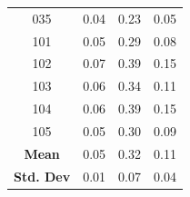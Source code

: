 \documentclass[12pt]{article}
\begin{document}
\begin{table}[!h]
\begin{tabular}{c | c c c}
	035 &   0.04 &     0.23 &       0.05 \\
	101 &   0.05 &     0.29 &       0.08 \\
	102 &   0.07 &     0.39 &       0.15 \\
	103 &   0.06 &     0.34 &       0.11 \\
	104 &   0.06 &     0.39 &       0.15 \\
	105 &   0.05 &     0.30 &       0.09 \\
	\bottomrule
	\textbf{Mean} & 0.05 & 0.32 & 0.11 \\
	\textbf{Std. Dev} & 0.01 & 0.07 & 0.04 \\
\end{tabular}
\label{tab:2}
\end{table}


\end{document}
